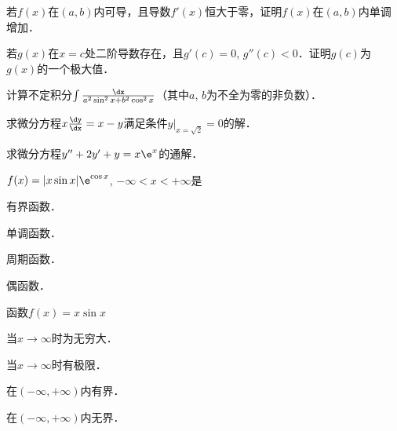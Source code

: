 \documentclass[plain,noanswer,medmath]{../../template/jnuexam}
\begin{document}


\begin{problem}
若$f(x)$在$(a,b)$内可导，且导数$f'(x)$恒大于零，证明$f(x)$在$(a,b)$内单调增加．
\end{problem}


\begin{problem}
若$g(x)$在$x = c$处二阶导数存在，且$g'(c) = 0$, $g''(c) < 0$．证明$g(c)$为$g(x)$的一个极大值．
\end{problem}



\begin{problem}
计算不定积分$\int \frac{\dx}{a^2\sin^2 x + b^2\cos^2 x}$（其中$a$, $b$为不全为零的非负数）．
\end{problem}




\begin{problem}[points=7]
求微分方程$x\frac{\dy}{\dx} = x - y$满足条件$y\big|_{x=\sqrt{2}} = 0$的解．
\end{problem}


\begin{problem}[points=8]
求微分方程$y'' + 2y' + y = x\e^x$的通解．
\end{problem}




\begin{problem}
$f(x) = |x\sin x|\e^{\cos x}$, $-\infty < x < +\infty$是\pickout{}
\begin{abcd}
\item 有界函数．
\item 单调函数．
\item 周期函数．
\item 偶函数．
\end{abcd}
\end{problem}


\begin{problem}
函数$f(x) = x\sin x$\pickout{}
\begin{abcd}
\item 当$x \to \infty$时为无穷大．
\item 当$x \to \infty$时有极限．
\item 在$(-\infty, +\infty)$内有界．
\item 在$(-\infty, +\infty)$内无界．
\end{abcd}
\end{problem}
\end{document}
